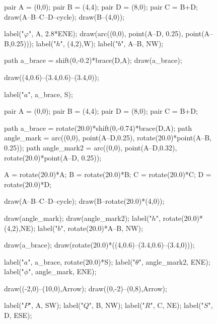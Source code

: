\documentclass[../key.tex]{subfiles}
\begin{document}
\begin{figure}[h]
	\begin{center}
		\begin{minipage}[b]{0.3\textwidth}
			\centering
			\begin{asy}[width=\textwidth]
				pair A = (0,0);
				pair B = (4,4);
				pair D = (8,0);
				pair C = B+D;
				draw(A--B--C--D--cycle);
				draw(B--(4,0));

				label("$\varphi$", A, 2.8*ENE);
				draw(arc((0,0), point(A--D, 0.25), point(A--B,0.25)));
				label("$h$", (4,2),W);
				label("$b$", A--B, NW);

				path a_brace = shift(0,-0.2)*brace(D,A);
				draw(a_brace);

				draw((4,0.6)--(3.4,0.6)--(3.4,0));

				label("$a$", a_brace, S);
			\end{asy}
		\end{minipage}
		\hfill
		\begin{minipage}[b]{0.3\textwidth}
			\centering
			\begin{asy}[width=\textwidth]
				pair A = (0,0);
				pair B = (4,4);
				pair D = (8,0);
				pair C = B+D;

				path a_brace = rotate(20.0)*shift(0,-0.74)*brace(D,A);
				path angle_mark = arc((0,0), point(A--D,0.25), rotate(20.0)*point(A--B, 0.25));
				path angle_mark2 = arc((0,0), point(A--D,0.32), rotate(20.0)*point(A--D, 0.25));

				A = rotate(20.0)*A;
				B = rotate(20.0)*B;
				C = rotate(20.0)*C;
				D = rotate(20.0)*D;

				draw(A--B--C--D--cycle);
				draw(B--rotate(20.0)*(4,0));

				draw(angle_mark);
				draw(angle_mark2);
				label("$h$", rotate(20.0)*(4,2),NE);
				label("$b$", rotate(20.0)*A--B, NW);

				draw(a_brace);
				draw(rotate(20.0)*((4,0.6)--(3.4,0.6)--(3.4,0)));

				label("$a$", a_brace, rotate(20.0)*S);
				label("$\theta$", angle_mark2, ENE);
				label("$\phi$", angle_mark, ENE);

				draw((-2,0)--(10,0),Arrow);
				draw((0,-2)--(0,8),Arrow);

				label("$P$", A, SW);
				label("$Q$", B, NW);
				label("$R$", C, NE);
				label("$S$", D, ESE);
			\end{asy}
		\end{minipage}
		\hfill
		\begin{minipage}[b]{0.3\textwidth}
			\centering
			\begin{asy}[width=\textwidth]


\end{asy}
\end{minipage}
\end{center}
\end{figure}
\end{document}
